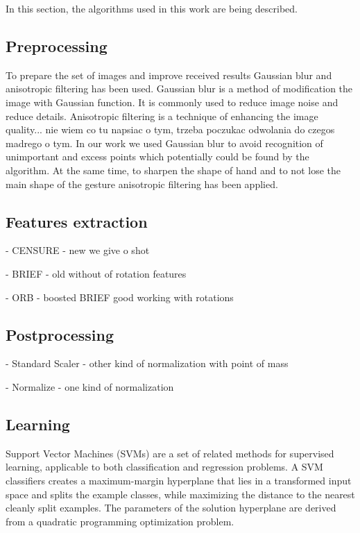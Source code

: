 \documentclass[11pt,a4paper]{article}
\begin{document}
	In this section, the algorithms used in this work are being described.

\subsection{Preprocessing}
	
	To prepare the set of images and improve received results Gaussian blur and anisotropic filtering has been used. Gaussian blur is a method of modification the image with Gaussian function. It is commonly used to reduce image noise and reduce details. Anisotropic filtering is a technique of enhancing the image quality... nie wiem co tu napsiac o tym, trzeba poczukac odwolania do czegos madrego o tym. In our work we used Gaussian blur to avoid recognition of unimportant and excess points which potentially could be found by the algorithm. At the same time, to sharpen the shape of hand and to not lose the main shape of the gesture anisotropic filtering has been applied.

\subsection{Features extraction}

- CENSURE - new we give o shot

- BRIEF - old without of rotation features

- ORB - boosted BRIEF good working with rotations

\subsection{Postprocessing}

- Standard Scaler - other kind of normalization with point of mass

- Normalize - one kind of normalization

\subsection{Learning}

Support Vector Machines (SVMs) are a set of related methods for supervised learning, applicable to both classification and regression problems. A SVM classifiers creates a maximum-margin hyperplane that lies in a transformed input space and splits the example classes, while maximizing the distance to the nearest cleanly split examples. The parameters of the solution hyperplane are derived from a quadratic programming optimization problem\cite{SVM1}.
\end{document}
